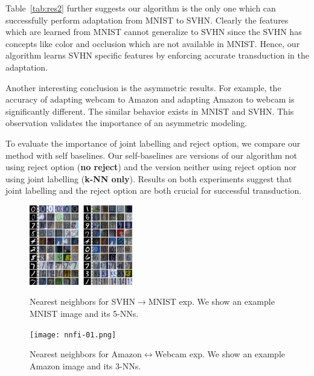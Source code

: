 Table~\ref{tab:res2} further suggests our algorithm is the only one which can successfully perform adaptation from MNIST to SVHN. Clearly the features which are learned from MNIST cannot generalize to SVHN since the SVHN has concepts like color and occlusion which are not available in MNIST. Hence, our algorithm learns SVHN specific features by enforcing accurate transduction in the adaptation.

Another interesting conclusion is the asymmetric results. For example, the accuracy of adapting webcam to Amazon and adapting Amazon to webcam is significantly different. The similar behavior exists in MNIST and SVHN. This observation validates the importance of an asymmetric modeling.

To evaluate the importance of joint labelling and reject option, we compare our method with self baselines. Our self-baselines are versions of our algorithm not using reject option (\textbf{no reject}) and the version neither using reject option nor using joint labelling (\textbf{k-NN only}). Results on both experiments suggest that joint labelling and the reject option are both crucial for successful transduction. 

\begin{figure}
\small
\begin{small}
\includegraphics[width=0.4\textwidth]{nndig}
\vspace{-5mm}
\caption{Nearest neighbors for SVHN$\rightarrow$MNIST exp. We show an example MNIST image and its 5-NNs.}
\label{fig:nn}
\texttt{[image: nnfi-01.png]}
\caption{Nearest neighbors for Amazon$\leftrightarrow$Webcam exp. We show an example Amazon image and its 3-NNs. }
\label{fig:nnoffice}
\end{small}
\vspace{-15mm}
\end{figure}

